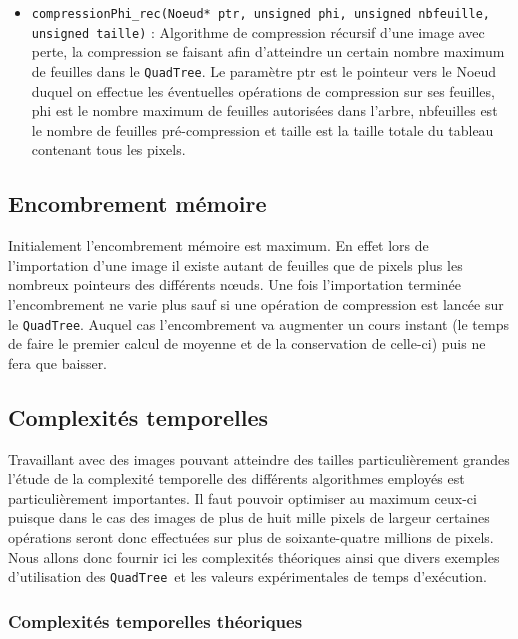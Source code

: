 \documentclass{article}
\newcommand{\info}{\texttt}
\newcommand{\qt}{\info{QuadTree}}
\begin{document}
\begin{itemize}
	    	\item \info{compressionPhi\_rec(Noeud* ptr, unsigned phi, unsigned nbfeuille, unsigned taille)} : Algorithme de compression récursif d'une image avec perte, la compression se faisant afin d'atteindre un certain nombre maximum de feuilles dans le \qt. Le paramètre ptr est le pointeur vers le Noeud duquel on effectue les éventuelles opérations de compression sur ses feuilles, phi est le nombre maximum de feuilles autorisées dans l'arbre, nbfeuilles est le nombre de feuilles pré-compression et taille est la taille totale du tableau contenant tous les pixels.
	    \end{itemize}
    
    \subsection{Encombrement mémoire}
    
    Initialement l'encombrement mémoire est maximum. En effet lors de l'importation d'une image il existe autant de feuilles que de pixels plus les nombreux pointeurs des différents nœuds. Une fois l'importation terminée l'encombrement ne varie plus sauf si une opération de compression est lancée sur le \qt. Auquel cas l'encombrement va augmenter un cours instant (le temps de faire le premier calcul de moyenne et de la conservation de celle-ci) puis ne fera que baisser.
    
    \subsection{Complexités temporelles}

    Travaillant avec des images pouvant atteindre des tailles particulièrement grandes l'étude de la complexité temporelle des différents algorithmes employés est particulièrement importantes. Il faut pouvoir optimiser au maximum ceux-ci puisque dans le cas des images de plus de huit mille pixels de largeur certaines opérations seront donc effectuées sur plus de soixante-quatre millions de pixels. Nous allons donc fournir ici les complexités théoriques ainsi que divers exemples d'utilisation des \qt\ et les valeurs expérimentales de temps d'exécution.
    
        \subsubsection{Complexités temporelles théoriques}
        
\end{document}
